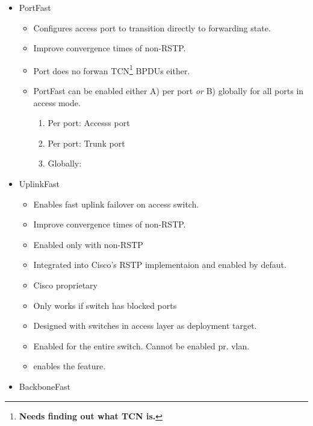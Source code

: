 \begin{itemize}
    \item PortFast
    \begin{itemize}
        \item Configures access port to transition directly to forwarding state.
        \item Improve convergence times of non-RSTP.
        \item Port does no forwan TCN\footnote{\textbf{Needs finding out what TCN is.}} BPDUs either.
        \item PortFast can be enabled either A) per port \textit{or} B) globally for all ports in access mode.
        \begin{enumerate}
            \item Per port: {\footnotesize Accesss port}\\
            \item Per port: {\footnotesize Trunk port}\\
            \item Globally:\\
        \end{enumerate}
    \end{itemize}
    \item UplinkFast
    \begin{itemize}
        \item Enables fast uplink failover on access switch.
        \item Improve convergence times of non-RSTP.
        \item Enabled only with non-RSTP
        \item Integrated into Cisco's RSTP implementaion and enabled by defaut.
        \item Cisco proprietary
        \item Only works if switch has blocked ports
        \item Designed with switches in access layer as deployment target.
        \item Enabled for the entire switch. Cannot be enabled pr. vlan.
        \item {} enables the feature.
    \end{itemize}
    \item BackboneFast
    \begin{itemize}

\end{itemize}
\end{itemize}
